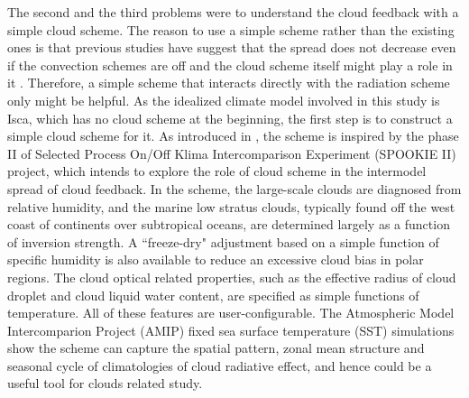 The second and the third problems were to understand the cloud feedback with a simple cloud scheme. The reason to use a simple scheme rather than the existing ones is that previous studies have suggest that the spread does not decrease even if the convection schemes are off \citep{Webb2015} and the cloud scheme itself might play a role in it \citep[e.g.,][]{Qu2014,Geoffroy2017}. Therefore, a simple scheme that interacts directly with the radiation scheme only might be helpful. As the idealized climate model involved in this study is Isca, which has no cloud scheme at the beginning, the first step is to construct a simple cloud scheme for it. As introduced in , the scheme \citep{Liu2021simcloud} is inspired by the phase II of Selected Process On/Off Klima Intercomparison Experiment (SPOOKIE II) project, which intends to explore the role of cloud scheme in the intermodel spread of cloud feedback. In the scheme, the large-scale clouds are diagnosed from relative humidity, and the marine low stratus clouds, typically found off the west coast of continents over subtropical oceans, are determined largely as a function of inversion strength. A ``freeze-dry" adjustment based on a simple function of specific humidity is also available to reduce an excessive cloud bias in polar regions. The cloud optical related properties, such as the effective radius of cloud droplet and cloud liquid water content, are specified as simple functions of temperature. All of these features are user-configurable. The Atmospheric Model Intercomparion Project (AMIP) fixed sea surface temperature (SST) simulations show the scheme can capture the spatial pattern, zonal mean structure and seasonal cycle of climatologies of cloud radiative effect, and hence could be a useful tool for clouds related study.

